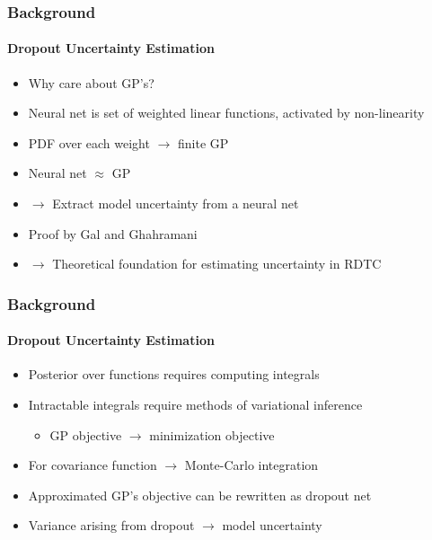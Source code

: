 \documentclass[9pt]{beamer}
\begin{document}
\begin{frame}
\frametitle{Background}
\framesubtitle{Dropout Uncertainty Estimation}
	\begin{itemize}
	\item Why care about GP's?
	\item Neural net is set of weighted linear functions, activated by non-linearity
	\item PDF over each weight $\rightarrow$ finite GP
	\item Neural net $\approx$ GP
	\item $\rightarrow$ Extract model uncertainty from a neural net
	\item Proof by Gal and Ghahramani \cite{gal2016dropout}
	\item $\rightarrow$ Theoretical foundation for estimating uncertainty in RDTC
\end{itemize}
\end{frame}

\begin{frame}
\frametitle{Background}
\framesubtitle{Dropout Uncertainty Estimation}
\begin{itemize}
	\item Posterior over functions requires computing integrals
	\item Intractable integrals require methods of variational inference
	\begin{itemize}
		\item GP objective $\rightarrow$ minimization objective
	\end{itemize}
	\item For covariance function $\rightarrow$ Monte-Carlo integration
	\item Approximated GP's objective can be rewritten as dropout net
	\item Variance arising from dropout $\rightarrow$ model uncertainty
\end{itemize}
\end{frame}
\end{document}
